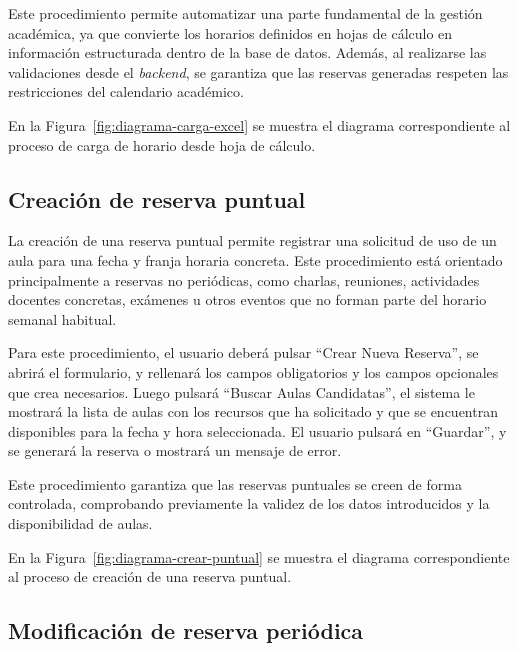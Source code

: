 Este procedimiento permite automatizar una parte fundamental de la gestión académica, ya que convierte los horarios definidos en hojas de cálculo en información estructurada dentro de la base de datos. Además, al realizarse las validaciones desde el \textit{backend}, se garantiza que las reservas generadas respeten las restricciones del calendario académico.

En la Figura~\ref{fig:diagrama-carga-excel} se muestra el diagrama correspondiente al proceso de carga de horario desde hoja de cálculo.


\subsection{Creación de reserva puntual}

La creación de una reserva puntual permite registrar una solicitud de uso de un aula para una fecha y franja horaria concreta. Este procedimiento está orientado principalmente a reservas no periódicas, como charlas, reuniones, actividades docentes concretas, exámenes u otros eventos que no forman parte del horario semanal habitual.

Para este procedimiento, el usuario deberá pulsar ``Crear Nueva Reserva'', se abrirá el formulario, y rellenará los campos obligatorios y los campos opcionales que crea necesarios. Luego pulsará ``Buscar Aulas Candidatas'', el sistema le mostrará la lista de aulas con los recursos que ha solicitado y que se encuentran disponibles para la fecha y hora seleccionada. El usuario pulsará en ``Guardar'', y se generará la reserva o mostrará un mensaje de error.

Este procedimiento garantiza que las reservas puntuales se creen de forma controlada, comprobando previamente la validez de los datos introducidos y la disponibilidad de aulas.

En la Figura~\ref{fig:diagrama-crear-puntual} se muestra el diagrama correspondiente al proceso de creación de una reserva puntual.


\subsection{Modificación de reserva periódica}

